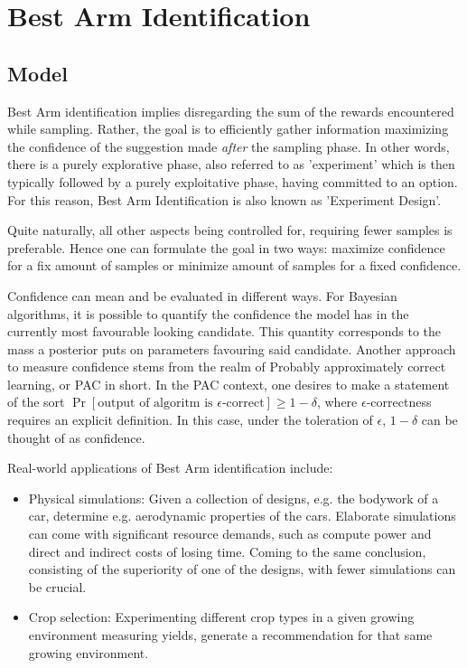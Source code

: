 \section{Best Arm Identification}
\subsection{Model}\label{ss:top-1_model}

Best Arm identification implies disregarding the sum of the rewards encountered while sampling. Rather, the goal is to efficiently gather information maximizing the confidence of the suggestion made \emph{after} the sampling phase. In other words, there is a purely explorative phase, also referred to as 'experiment' which is then typically followed by a purely exploitative phase, having committed to an option. For this reason, Best Arm Identification is also known as 'Experiment Design'.

Quite naturally, all other aspects being controlled for, requiring fewer samples is preferable. Hence one can formulate the goal in two ways: maximize confidence for a fix amount of samples or minimize amount of samples for a fixed confidence.

Confidence can mean and be evaluated in different ways. For Bayesian algorithms, it is possible to quantify the confidence the model has in the currently most favourable looking candidate. This quantity corresponds to the mass a posterior puts on parameters favouring said candidate. Another approach to measure confidence stems from the realm of Probably approximately correct learning, or PAC in short. In the PAC context, one desires to make a statement of the sort $\Pr[\text{output of algoritm is $\epsilon$-correct}] \geq 1 - \delta$, where $\epsilon$-correctness requires an explicit definition. In this case, under the toleration of $\epsilon$, $1 - \delta$ can be thought of as confidence.

Real-world applications of Best Arm identification include:
\begin{itemize}
  \item Physical simulations: Given a collection of designs, e.g. the bodywork of a car, determine e.g. aerodynamic properties of the cars. Elaborate simulations can come with significant resource demands, such as compute power and direct and indirect costs of losing time. Coming to the same conclusion, consisting of the superiority of one of the designs, with fewer simulations can be crucial.
  \item Crop selection: Experimenting different crop types in a given growing environment measuring yields, generate a recommendation for that same growing environment.
\end{itemize}

